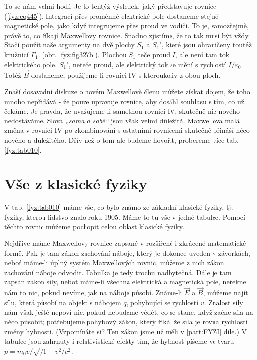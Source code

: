   To se nám velmi hodí. Je to tentýž výsledek, jaký představuje rovnice (\ref{fyz:eq445}). 
  Integrací přes proměnné elektrické pole dostaneme stejné magnetické pole, jako když integrujeme 
  přes proud ve vodiči. To je, samozřejmě, právě to, co říkají Maxwellovy rovnice. Snadno zjistíme, 
  že to tak musí být vždy. Stačí použít naše argumenty na dvě plochy \(S_1\) a \(S_1'\), které jsou 
  ohraničeny toutéž kružnicí \(\Gamma_1\). (obr. \ref{fyz:fig327b}). Plochou \(S_1\) teče proud 
  \(I\), ale není tam tok elektrického pole. \(S_1'\), neteče proud, ale elektrický tok se mění s 
  rychlostí \(I/\varepsilon_0\). Totéž \(\vec{B}\) dostaneme, použijeme-li rovnici IV s kteroukoliv 
  z obou ploch. 
  
  Znaší dosavadní diskuze o novém Maxwellově členu můžete získat dojem, že toho mnoho nepřidává - 
  že pouze upravuje rovnice, aby dosáhl souhlasu s tím, co už čekáme. Je pravda, že uvažujeme-li 
  samotnou rovnici IV, skutečně nic nového nedostáváme. Slova \emph{„sama o sobě“} jsou však velmi 
  důležitá. Maxwellova malá změna v rovnici IV po zkombinování s ostatními rovnicemi skutečně 
  přináší něco nového a důležitého. Dřív než o tom ale budeme hovořit, probereme více tab. 
  \ref{fyz:tab010}.
  
\section{Vše z klasické fyziky}\label{fyz:IIchapXVIIIsecII}
  V tab. \ref{fyz:tab010} máme vše, co bylo známo ze základní klasické fyziky, tj. fyziky, kterou 
  lidstvo znalo roku 1905. Máme to tu vše v jedné tabulce. Pomocí těchto rovnic můžeme pochopit 
  celou oblast klasické fyziky.
  
  Nejdříve máme Maxwellovy rovnice zapsané v rozšířené i zkrácené matematické formě. Pak je tam 
  zákon zachování náboje, který je dokonce uveden v závorkách, neboť máme-li úplný systém 
  Maxwellových rovnic, můžeme z nich zákon zachování náboje odvodit. Tabulka je tedy trochu 
  nadbytečná. Dále je tam zapsán zákon síly, neboť máme-li všechna elektrická a magnetická pole, 
  neřekne nám to nic, pokud nevíme, jak na náboje působí. Známe-li \(\vec{E}\) a \(\vec{B}\), 
  můžeme najít sílu, která působí na objekt s nábojem \(q\), pohybující se rychlostí \(v\). Znalost 
  síly nám však ještě nepoví nic, pokud nebudeme vědět, co se stane, když začne síla na něco 
  působit; potřebujeme pohybový zákon, který říká, že síla je rovna rychlosti změny hybnosti. 
  (Vzpomínáte si? Ten zákon jsme už měli v \ref{part:FYZI} díle.) V tabulce jsou zahrnuty i 
  relativistické efekty tím, že hybnost píšeme ve tvaru \(p = m_0v/\sqrt{/1 - v^2/c^2}\).
  
